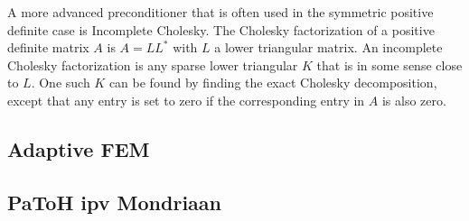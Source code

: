 \documentclass[11pt]{amsart}
\theoremstyle{definition}
\begin{document}
A more advanced preconditioner that is often used in the symmetric positive definite case is Incomplete Cholesky.  The Cholesky factorization of a positive definite matrix $A$ is $A = LL^*$ with $L$ a lower triangular matrix. An incomplete Cholesky factorization is any sparse lower triangular $K$ that is in some sense close to $L$. One such $K$ can be found by finding the exact Cholesky decomposition, except that any entry is set to zero if the corresponding entry in $A$ is also zero. \cite[\S11.5.8]{golub}
\subsection{Adaptive FEM}
\subsection{PaToH ipv Mondriaan}




\end{document}
